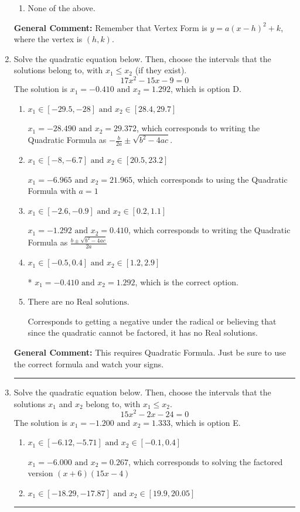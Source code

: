 \documentclass{extbook}[14pt]
\newcommand{\litem}[1]{\item #1

\rule{\textwidth}{0.4pt}}
\begin{document}
\begin{enumerate}
{\begin{enumerate}[label=\Alph*.]
\begin{multicols}{2}
\end{multicols}\item None of the above.\end{enumerate}
\textbf{General Comment:} Remember that Vertex Form is $y = a(x-h)^2+k$, where the vertex is $(h, k)$.
}
\litem{
Solve the quadratic equation below. Then, choose the intervals that the solutions belong to, with $x_1 \leq x_2$ (if they exist).
\[ 17x^{2} -15 x -9 = 0 \]The solution is \( x_1 = -0.410 \text{ and } x_2 = 1.292 \), which is option D.\begin{enumerate}[label=\Alph*.]
\item \( x_1 \in [-29.5, -28] \text{ and } x_2 \in [28.4, 29.7] \)

 $x_1 = -28.490 \text{ and } x_2 = 29.372$, which corresponds to writing the Quadratic Formula as $-\frac{b}{2a} \pm \sqrt{b^2 - 4ac}$.
\item \( x_1 \in [-8, -6.7] \text{ and } x_2 \in [20.5, 23.2] \)

 $x_1 = -6.965 \text{ and } x_2 = 21.965$, which corresponds to using the Quadratic Formula with $a=1$
\item \( x_1 \in [-2.6, -0.9] \text{ and } x_2 \in [0.2, 1.1] \)

 $x_1 = -1.292 \text{ and } x_2 = 0.410$, which corresponds to writing the Quadratic Formula as $\frac{b \pm \sqrt{b^2 - 4ac}}{2a}$
\item \( x_1 \in [-0.5, 0.4] \text{ and } x_2 \in [1.2, 2.9] \)

* $x_1 = -0.410 \text{ and } x_2 = 1.292$, which is the correct option.
\item \( \text{There are no Real solutions.} \)

Corresponds to getting a negative under the radical or believing that since the quadratic cannot be factored, it has no Real solutions.
\end{enumerate}

\textbf{General Comment:} This requires Quadratic Formula. Just be sure to use the correct formula and watch your signs.
}
\litem{
Solve the quadratic equation below. Then, choose the intervals that the solutions $x_1$ and $x_2$ belong to, with $x_1 \leq x_2$.
\[ 15x^{2} -2 x -24 = 0 \]The solution is \( x_1 = -1.200 \text{ and } x_2 = 1.333 \), which is option E.\begin{enumerate}[label=\Alph*.]
\item \( x_1 \in [-6.12, -5.71] \text{ and } x_2 \in [-0.1, 0.4] \)

$x_1 = -6.000 \text{ and } x_2 = 0.267$, which corresponds to solving the factored version $(x + 6)(15x -4)$
\item \( x_1 \in [-18.29, -17.87] \text{ and } x_2 \in [19.9, 20.05] \)


\end{enumerate}}
\end{enumerate}
\end{document}
